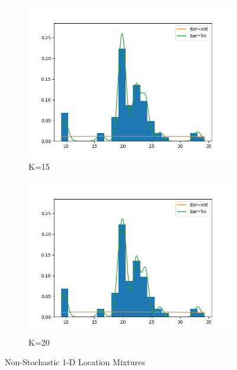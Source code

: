 \begin{figure}
     \hfill
     \begin{subfigure}[b]{0.3\textwidth}
         \centering
         \includegraphics[width=\textwidth]{../code/regular_loc_only_plots/galaxies_hist_k_15.png}
         \caption{K=15}
         \label{fig:Reg_loc_only15}
     \end{subfigure}
     \hfill
     \begin{subfigure}[b]{0.3\textwidth}
         \centering
         \includegraphics[width=\textwidth]{../code/regular_loc_only_plots/galaxies_hist_k_20.png}
         \caption{K=20}
         \label{fig:Reg_loc_only20}
     \end{subfigure}
        \caption{Non-Stochastic 1-D Location Mixtures}
        \label{fig:Reg_loc_only}
\end{figure}
